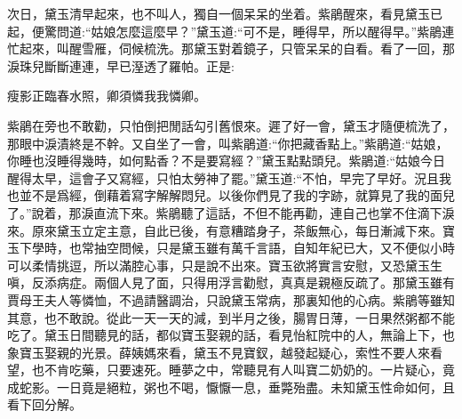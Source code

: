 \begin{parag}
    次日，黛玉清早起來，也不叫人，獨自一個呆呆的坐着。紫鵑醒來，看見黛玉已起，便驚問道:“姑娘怎麼這麼早？”黛玉道:“可不是，睡得早，所以醒得早。”紫鵑連忙起來，叫醒雪雁，伺候梳洗。那黛玉對着鏡子，只管呆呆的自看。看了一回，那淚珠兒斷斷連連，早已溼透了羅帕。正是:
\end{parag}


\begin{poem}
    \begin{pl}
        瘦影正臨春水照，卿須憐我我憐卿。
    \end{pl}
\end{poem}


\begin{parag}
    紫鵑在旁也不敢勸，只怕倒把閒話勾引舊恨來。遲了好一會，黛玉才隨便梳洗了，那眼中淚漬終是不幹。又自坐了一會，叫紫鵑道:“你把藏香點上。”紫鵑道:“姑娘，你睡也沒睡得幾時，如何點香？不是要寫經？”黛玉點點頭兒。紫鵑道:“姑娘今日醒得太早，這會子又寫經，只怕太勞神了罷。”黛玉道:“不怕，早完了早好。況且我也並不是爲經，倒藉着寫字解解悶兒。以後你們見了我的字跡，就算見了我的面兒了。”說着，那淚直流下來。紫鵑聽了這話，不但不能再勸，連自己也掌不住滴下淚來。原來黛玉立定主意，自此已後，有意糟踏身子，茶飯無心，每日漸減下來。寶玉下學時，也常抽空問候，只是黛玉雖有萬千言語，自知年紀已大，又不便似小時可以柔情挑逗，所以滿腔心事，只是說不出來。寶玉欲將實言安慰，又恐黛玉生嗔，反添病症。兩個人見了面，只得用浮言勸慰，真真是親極反疏了。那黛玉雖有賈母王夫人等憐恤，不過請醫調治，只說黛玉常病，那裏知他的心病。紫鵑等雖知其意，也不敢說。從此一天一天的減，到半月之後，腸胃日薄，一日果然粥都不能吃了。黛玉日間聽見的話，都似寶玉娶親的話，看見怡紅院中的人，無論上下，也象寶玉娶親的光景。薛姨媽來看，黛玉不見寶釵，越發起疑心，索性不要人來看望，也不肯吃藥，只要速死。睡夢之中，常聽見有人叫寶二奶奶的。一片疑心，竟成蛇影。一日竟是絕粒，粥也不喝，懨懨一息，垂斃殆盡。未知黛玉性命如何，且看下回分解。
\end{parag}